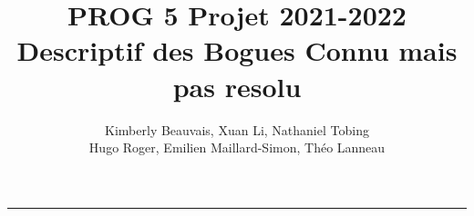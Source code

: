 \documentclass[a4paper]{article} %
\title{PROG 5 Projet 2021-2022 \\
\large Descriptif des Bogues Connu mais pas resolu}
\author{Kimberly Beauvais, Xuan Li, Nathaniel Tobing \\
Hugo Roger, Emilien Maillard-Simon, Théo Lanneau}
\begin{document}
\maketitle
\begin{center}
\rule{\textwidth}{1pt}
\end{center}

\renewcommand{\contentsname}{Table des Matières}
\tableofcontents
\end{document}
